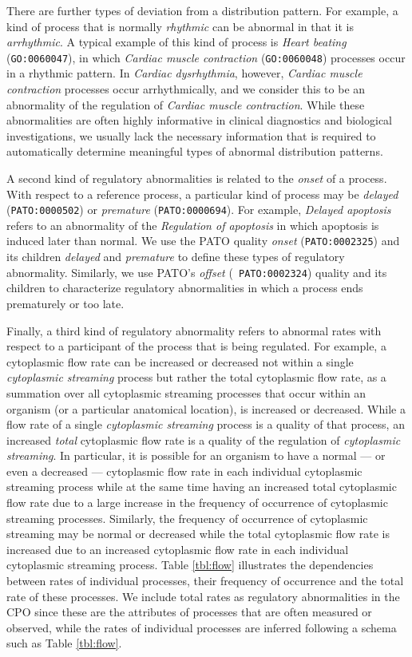 \documentclass{bioinfo}
\begin{document}
There are further types of deviation from a distribution pattern. For
example, a kind of process that is normally {\em rhythmic} can be
abnormal in that it is {\em arrhythmic}. A typical example of this
kind of process is {\em Heart beating} ({\tt GO:0060047}), in which
{\em Cardiac muscle contraction} ({\tt GO:0060048}) processes occur in
a rhythmic pattern. In {\em Cardiac dysrhythmia}, however, {\em
  Cardiac muscle contraction} processes occur arrhythmically, and we
consider this to be an abnormality of the regulation of {\em Cardiac
  muscle contraction}. While these abnormalities are often highly
informative in clinical diagnostics and biological investigations, we
usually lack the necessary information that is required to
automatically determine meaningful types of abnormal distribution
patterns.

A second kind of regulatory abnormalities is related to the {\em
  onset} of a process. With respect to a reference process, a
particular kind of process may be {\em delayed} ({\tt PATO:0000502})
or {\em premature} ({\tt PATO:0000694}). For example, {\em Delayed
  apoptosis} refers to an abnormality of the {\em Regulation of
  apoptosis} in which apoptosis is induced later than normal.  We use
the PATO quality {\em onset} ({\tt PATO:0002325}) and its children
{\em delayed} and {\em premature} to define these types of regulatory
abnormality. Similarly, we use PATO's {\em offset} ({\tt
  PATO:0002324}) quality and its children to characterize regulatory
abnormalities in which a process ends prematurely or too late.

Finally, a third kind of regulatory abnormality refers to abnormal
rates with respect to a participant of the process that is being
regulated. For example, a cytoplasmic flow rate can be increased or
decreased not within a single {\em cytoplasmic streaming} process but
rather the total cytoplasmic flow rate, as a summation over all
cytoplasmic streaming processes that occur within an organism (or a
particular anatomical location), is increased or decreased. While a
flow rate of a single {\em cytoplasmic streaming} process is a quality
of that process, an increased {\em total} cytoplasmic flow rate is a
quality of the regulation of {\em cytoplasmic streaming}. In
particular, it is possible for an organism to have a normal --- or
even a decreased --- cytoplasmic flow rate in each individual
cytoplasmic streaming process while at the same time having an
increased total cytoplasmic flow rate due to a large increase in the
frequency of occurrence of cytoplasmic streaming processes. Similarly,
the frequency of occurrence of cytoplasmic streaming may be normal or
decreased while the total cytoplasmic flow rate is increased due to an
increased cytoplasmic flow rate in each individual cytoplasmic
streaming process. Table \ref{tbl:flow} illustrates the dependencies
between rates of individual processes, their frequency of occurrence
and the total rate of these processes. We include total rates as
regulatory abnormalities in the CPO since these are the attributes of
processes that are often measured or observed, while the rates of
individual processes are inferred following a schema such as Table
\ref{tbl:flow}.
\end{document}

